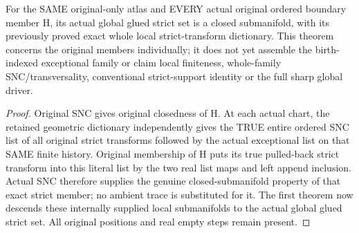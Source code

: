 \begin{theorem}
\label{hir:sharp-actual-original-global-smooth-strict-divisors}
\leanok
For the SAME original-only atlas and EVERY actual original ordered boundary
member H, its actual global glued strict set is a closed submanifold, with
its previously proved exact whole local strict-transform dictionary.
This theorem concerns the original members individually; it does not yet
assemble the birth-indexed exceptional family or claim local finiteness,
whole-family SNC/transversality, conventional strict-support identity or
the full sharp global driver.
\end{theorem}
\begin{proof}
Original SNC gives original closedness of H. At each actual chart, the
retained geometric dictionary independently gives the TRUE entire ordered
SNC list of all original strict transforms followed by the actual
exceptional list on that SAME finite history. Original membership of H
puts its true pulled-back strict transform into this literal list by the
two real list maps and left append inclusion. Actual SNC therefore supplies
the genuine closed-submanifold property of that exact strict member; no
ambient trace is substituted for it. The first theorem now descends these
internally supplied local submanifolds to the actual global glued strict
set. All original positions and real empty steps remain present.
\end{proof}
